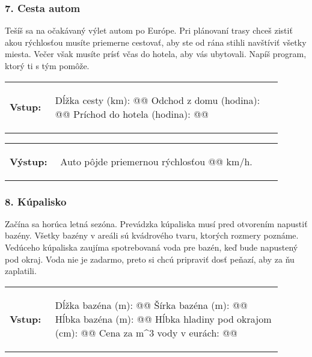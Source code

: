 \subsubsection*{7. Cesta autom}
Tešíš sa na očakávaný výlet autom po Európe. Pri plánovaní trasy chceš zistiť akou rýchlosťou musíte priemerne cestovať, aby ste od rána stihli navštíviť všetky miesta. Večer však musíte prísť včas do hotela, aby vás ubytovali. Napíš program, ktorý ti s tým pomôže.

\begin{tabular}{@{}p{0.15\linewidth}p{0.75\linewidth}}
\textbf{\small Vstup:} &
\vspace{-3em}
\begin{code}
Dĺžka cesty (km): @\fbox{\phantom{vstup}}@
Odchod z domu (hodina): @\fbox{\phantom{vstup}}@
Príchod do hotela (hodina): @\fbox{\phantom{vstup}}@
\end{code}
\end{tabular}

\vspace{-2em}
\begin{tabular}{@{}p{0.15\linewidth}p{0.75\linewidth}}
\textbf{\small Výstup:} &
\vspace{-3em}
\begin{code}
Auto pôjde priemernou rýchlosťou @\fbox{\phantom{vstup}}@ km/h.
\end{code}
\end{tabular}
\vspace{-2em}

\subsubsection*{8. Kúpalisko}
Začína sa horúca letná sezóna. Prevádzka kúpaliska musí pred otvorením napustiť bazény. Všetky bazény v areáli sú kvádrového tvaru, ktorých rozmery poznáme. Vedúceho kúpaliska zaujíma spotrebovaná voda pre bazén, keď bude napustený pod okraj. Voda nie je zadarmo, preto si chcú pripraviť dosť peňazí, aby za ňu zaplatili.

\begin{tabular}{@{}p{0.15\linewidth}p{0.75\linewidth}}
\textbf{\small Vstup:} &
\vspace{-3em}
\begin{code}
Dĺžka bazéna (m): @\fbox{\phantom{vstup}}@
Šírka bazéna (m): @\fbox{\phantom{vstup}}@
Hĺbka bazéna (m): @\fbox{\phantom{vstup}}@
Hĺbka hladiny pod okrajom (cm): @\fbox{\phantom{vstup}}@
Cena za m^3 vody v eurách: @\fbox{\phantom{vstup}}@ 
\end{code}
\end{tabular}

